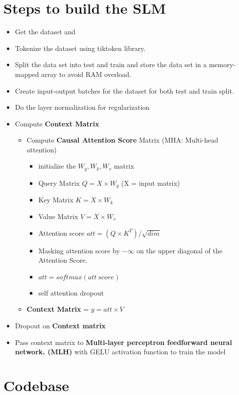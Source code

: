 \documentclass[conference]{IEEEtran}
\begin{document}
\section{Steps to build the SLM}
\begin{itemize}
    \item Get the dataset and 
    \item Tokenize the dataset using tiktoken library.
    \item Split the data set into test and train and store the data set in a memory-mapped array to avoid RAM overload.
    \item Create input-output batches for the dataset for both test and train split.
    \item Do the layer normalization for regularization
    \item Compute \textbf{Context Matrix} 
    \begin{itemize}
        \item Compute \textbf{Causal Attention Score} Matrix (MHA: Multi-head attention)
        \begin{itemize}
            \item initialize the $W_q, W_k, W_v$ matrix
            \item Query Matrix $Q = X \times W_q$ (X = input matrix)
            \item Key Matrix $K =  X \times W_k$ 
            \item Value Matrix $V = X \times W_v$
            \item Attention score $att = (Q \times K^T)/ \sqrt{dim}$
            \item Masking attention score by $-\infty$ on the upper diagonal of the Attention Score.
            \item $att = softmax(att \ score)$
            \item self attention dropout
        \end{itemize}
        \item \textbf{Context Matrix} = $y = att \times V$
    \end{itemize}
    \item Dropout on \textbf{Context matrix} 
    \item Pass context matrix to \textbf{Multi-layer perceptron feedforward neural network. (MLH)} with GELU activation function to train the model
\end{itemize}

\section{Codebase}
\end{document}
